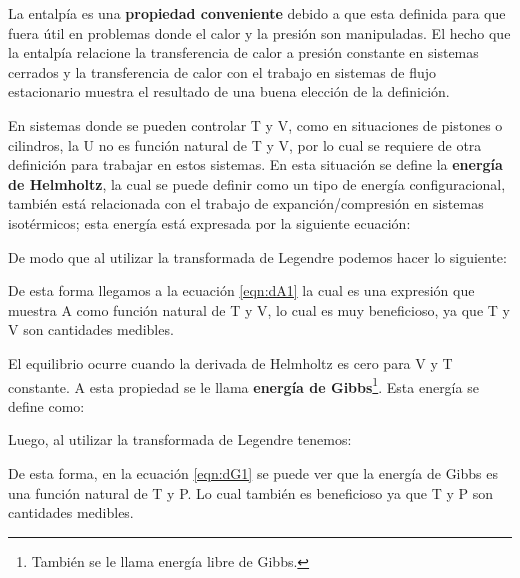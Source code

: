 La entalpía es una \textbf{propiedad conveniente} debido a que esta definida para que fuera útil en problemas donde el calor y la presión son manipuladas. El hecho que la entalpía relacione la transferencia de calor a presión constante en sistemas cerrados y la transferencia de calor con el trabajo en sistemas de flujo estacionario muestra el resultado de una buena elección de la definición.

En sistemas donde se pueden controlar T y V, como en situaciones de pistones o cilindros, la U no es función natural de T y V, por lo cual se requiere de otra definición para trabajar en estos sistemas. En esta situación se define la \textbf{energía de Helmholtz}, la cual se puede definir como un tipo de energía configuracional, también está relacionada con el trabajo de expanción/compresión en sistemas isotérmicos; esta energía está expresada por la siguiente ecuación:


De modo que al utilizar la transformada de Legendre podemos hacer lo siguiente:


De esta forma llegamos a la ecuación \ref{eqn:dA1} la cual es una expresión que muestra A como función natural de T y V, lo cual es muy beneficioso, ya que T y V son cantidades medibles.

El equilibrio ocurre cuando la derivada de Helmholtz es cero para V y T constante. A esta propiedad se le llama \textbf{energía de Gibbs}\footnote{También se le llama energía libre de Gibbs.}. Esta energía se define como:


Luego, al utilizar la transformada de Legendre tenemos:


De esta forma, en la ecuación \ref{eqn:dG1} se puede ver que la energía de Gibbs es una función natural de T y P. Lo cual también es beneficioso ya que T y P son cantidades medibles.

